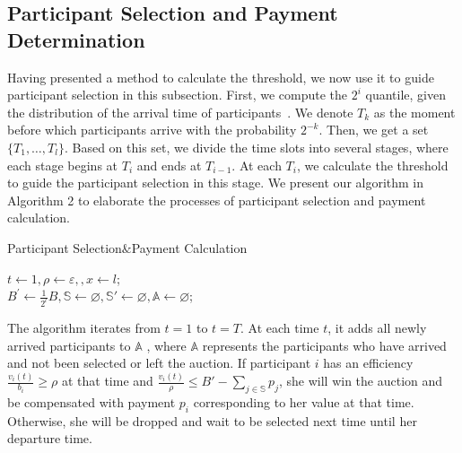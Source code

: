 \documentclass[10pt,journal,letterpaper,compsoc]{IEEEtran}
\begin{document}
\subsection{Participant Selection and Payment Determination}
Having presented a method to calculate the threshold, we now use it to guide participant selection in this subsection. First, we compute the $2^i$ quantile, given the distribution of the arrival time of participants~\cite{singer2013pricing}. We denote $T_k$ as the moment before which participants arrive with the probability $2^{-k}$. Then, we get a set $\{T_1, \dots,T_l\}$.  Based on this set, we divide the time slots into several stages, where each stage begins at $T_i$ and ends at $T_{i-1}$. At each $T_i$, we calculate the threshold to guide the participant selection in this stage. We present our algorithm in Algorithm 2 to elaborate the processes of participant selection and payment calculation.

\begin{algorithm}
\BlankLine
{}
\caption{Participant Selection$\&$Payment Calculation}
\label{alg:participant selection}
\begin{small}
$t\leftarrow1, \rho\leftarrow\varepsilon, , x\leftarrow l$;\\
$B^{'} \gets \frac{1}{2^{l}}B, \mathbb{S}\leftarrow\varnothing, \mathbb{S}'\leftarrow\varnothing, \mathbb{A}\leftarrow\varnothing$;\\
\end{small}
\end{algorithm}

The algorithm iterates from $t=1$ to $t=T$. At each time $t$, it adds all newly arrived participants to $\mathbb{A}$ , where $\mathbb{A}$ represents the participants who have arrived and not been selected or left the auction. If participant $i$ has an efficiency  $\frac{v_i(t)}{b_i} \ge \rho$ at that time and $\frac{v_i(t)}{\rho} \le B'-\sum_{j \in\mathbb{S}}p_j$, she will win the auction and be compensated with payment $p_i$ corresponding to her value at that time. Otherwise, she will be dropped and wait to be selected next time until her departure time.
\end{document}
